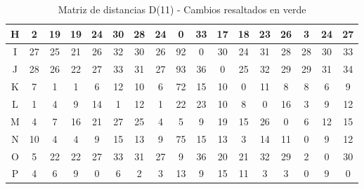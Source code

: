 \documentclass[12pt]{article}
\begin{document}
\begin{table}[h!]
\begin{tabular}{|c|c|c|c|c|c|c|c|c|c|c|c|c|c|c|c|c|}
H & 2 & \cellcolor{lightgreen} 19 & \cellcolor{lightgreen} 19 & \cellcolor{lightgreen} 24 & \cellcolor{lightgreen} 30 & \cellcolor{lightgreen} 28 & \cellcolor{lightgreen} 24 & 0 & \cellcolor{lightgreen} 33 & 17 & 18 & 23 & \cellcolor{lightgreen} 26 & 3 & \cellcolor{lightgreen} 24 & \cellcolor{lightgreen} 27 \\\hline
I & 27 & \cellcolor{lightgreen} 25 & 21 & 26 & 32 & 30 & 26 & 92 & 0 & 30 & 24 & 31 & 28 & 28 & \cellcolor{lightgreen} 30 & \cellcolor{lightgreen} 33 \\\hline
J & 28 & \cellcolor{lightgreen} 26 & 22 & 27 & 33 & 31 & 27 & 93 & 36 & 0 & 25 & 32 & 29 & 29 & \cellcolor{lightgreen} 31 & \cellcolor{lightgreen} 34 \\\hline
K & 7 & 1 & 1 & 6 & 12 & 10 & 6 & 72 & 15 & 10 & 0 & 11 & 8 & 8 & 6 & 9 \\\hline
L & 1 & 4 & \cellcolor{lightgreen} 9 & \cellcolor{lightgreen} 14 & 1 & 12 & 1 & 22 & \cellcolor{lightgreen} 23 & 10 & 8 & 0 & \cellcolor{lightgreen} 16 & 3 & 9 & 12 \\\hline
M & 4 & 7 & \cellcolor{lightgreen} 16 & \cellcolor{lightgreen} 21 & \cellcolor{lightgreen} 27 & \cellcolor{lightgreen} 25 & 4 & 5 & 9 & 19 & 15 & \cellcolor{lightgreen} 26 & 0 & 6 & 12 & 15 \\\hline
N & \cellcolor{lightgreen} 10 & \cellcolor{lightgreen} 4 & \cellcolor{lightgreen} 4 & \cellcolor{lightgreen} 9 & \cellcolor{lightgreen} 15 & \cellcolor{lightgreen} 13 & \cellcolor{lightgreen} 9 & \cellcolor{lightgreen} 75 & 15 & \cellcolor{lightgreen} 13 & 3 & \cellcolor{lightgreen} 14 & \cellcolor{lightgreen} 11 & 0 & \cellcolor{lightgreen} 9 & \cellcolor{lightgreen} 12 \\\hline
O & 5 & \cellcolor{lightgreen} 22 & \cellcolor{lightgreen} 22 & \cellcolor{lightgreen} 27 & \cellcolor{lightgreen} 33 & \cellcolor{lightgreen} 31 & \cellcolor{lightgreen} 27 & 9 & \cellcolor{lightgreen} 36 & 20 & 21 & 32 & \cellcolor{lightgreen} 29 & 2 & 0 & \cellcolor{lightgreen} 30 \\\hline
P & 4 & 6 & 9 & 0 & 6 & 2 & 3 & 13 & 9 & 15 & 11 & 3 & 3 & 0 & 9 & 0 \\\hline
\end{tabular}
\caption{Matriz de distancias D(11) - Cambios resaltados en verde}
\end{table}
\end{document}
